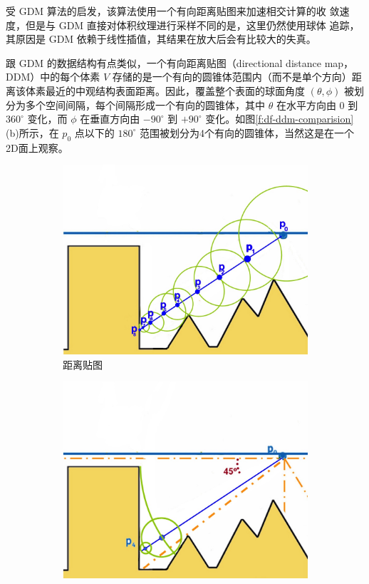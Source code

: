 受 GDM 算法的启发，该算法使用一个有向距离贴图来加速相交计算的收 敛速度，但是与 GDM 直接对体积纹理进行采样不同的是，这里仍然使用球体 追踪，其原因是 GDM 依赖于线性插值，其结果在放大后会有比较大的失真。

跟 GDM 的数据结构有点类似，一个有向距离贴图（directional distance map，DDM）中的每个体素 $V$ 存储的是一个有向的圆锥体范围内（而不是单个方向）距离该体素最近的中观结构表面距离。因此，覆盖整个表面的球面角度 $(\theta, \phi)$ 被划分为多个空间间隔，每个间隔形成一个有向的圆锥体，其中 $\theta$ 在水平方向由 0 到 $360^{\circ}$ 变化，而 $\phi$ 在垂直方向由 $−90^{\circ}$ 到 $+90^{\circ}$ 变化。如图\ref{f:df-ddm-comparision}(b)所示，在 $p_0$ 点以下的 $180^{\circ}$ 范围被划分为4个有向的圆锥体，当然这是在一个2D面上观察。

\begin{figure}
	\begin{subfigure}[b]{0.5\textwidth}
		\includegraphics[width=\textwidth]{figures/df/ddm-comparision-1}
		\caption{距离贴图}
	\end{subfigure}
	\begin{subfigure}[b]{0.5\textwidth}
		\includegraphics[width=\textwidth]{figures/df/ddm-comparision-2}

\end{subfigure}
\end{figure}
